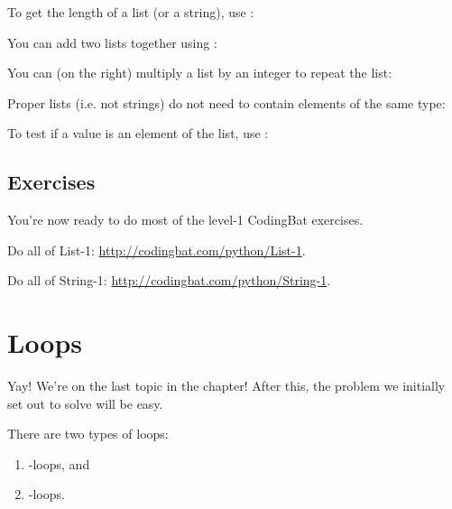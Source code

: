 To get the length of a list (or a string), use :


You can add two lists together using \code{+}:


You can (on the right) multiply a list by an integer to repeat the list:


Proper lists (i.e. not strings) do not need to contain elements of the
same type:


To test if a value is an element of the list, use :


\subsection{Exercises}

You're now ready to do most of the level-1 CodingBat exercises.

\begin{exercise}
  Do all of List-1: \url{http://codingbat.com/python/List-1}.
\end{exercise}
\begin{exercise}
  Do all of String-1: \url{http://codingbat.com/python/String-1}.
\end{exercise}

\section{Loops}

Yay! We're on the last topic in the chapter! After this, the problem
we initially set out to solve will be easy.

There are two types of loops:

\begin{enumerate}
\item {}-loops, and
\item {}-loops.
\end{enumerate}

